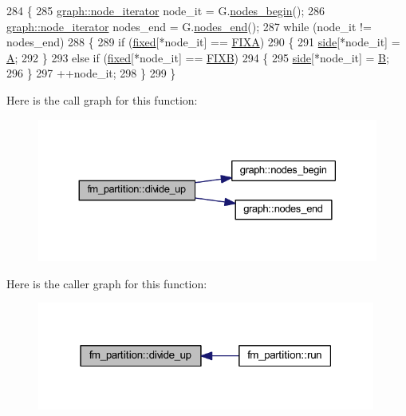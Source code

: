 \begin{DoxyCode}
284 \{
285     \mbox{\hyperlink{classgraph_a2cb374b84c133ce13f94e73c3e5da7fa}{graph::node\_iterator}} node\_it = G.\mbox{\hyperlink{classgraph_aec053a4b509d1be804237a80044c54c0}{nodes\_begin}}();
286     \mbox{\hyperlink{classgraph_a2cb374b84c133ce13f94e73c3e5da7fa}{graph::node\_iterator}} nodes\_end = G.\mbox{\hyperlink{classgraph_abbf9c0cb5629e98e1142254911238173}{nodes\_end}}();
287     \textcolor{keywordflow}{while} (node\_it != nodes\_end)
288     \{
289     \textcolor{keywordflow}{if} (\mbox{\hyperlink{classfm__partition_a3b04658dbb5b27ddd20194ff74a71082}{fixed}}[*node\_it] == \mbox{\hyperlink{classfm__partition_a468a80e072d3ff18e5da33005825bcb1}{FIXA}})
290     \{
291         \mbox{\hyperlink{classfm__partition_af83309e781e9658fc0ff923ced087bfc}{side}}[*node\_it] = \mbox{\hyperlink{classfm__partition_a738e75c601403754e61e6dac623fd3ab}{A}};
292     \}
293     \textcolor{keywordflow}{else} \textcolor{keywordflow}{if} (\mbox{\hyperlink{classfm__partition_a3b04658dbb5b27ddd20194ff74a71082}{fixed}}[*node\_it] == \mbox{\hyperlink{classfm__partition_a0b9a66f0e8093ee83482f93d6aa5b2eb}{FIXB}})
294     \{
295         \mbox{\hyperlink{classfm__partition_af83309e781e9658fc0ff923ced087bfc}{side}}[*node\_it] = \mbox{\hyperlink{classfm__partition_a42515c44eecb7ba3e2ec549a877ef238}{B}};
296     \}
297     ++node\_it;
298     \}
299 \}
\end{DoxyCode}
Here is the call graph for this function\+:\nopagebreak
\begin{figure}[H]
\begin{center}
\leavevmode
\includegraphics[width=330pt]{classfm__partition_ad768579b813500dc2d267aac5668ed48_cgraph}
\end{center}
\end{figure}
Here is the caller graph for this function\+:\nopagebreak
\begin{figure}[H]
\begin{center}
\leavevmode
\includegraphics[width=315pt]{classfm__partition_ad768579b813500dc2d267aac5668ed48_icgraph}
\end{center}
\end{figure}
\mbox{\label{classfm__partition_a42fa2e19fb3fde093a1a05d0bd6d8ad1}} 
